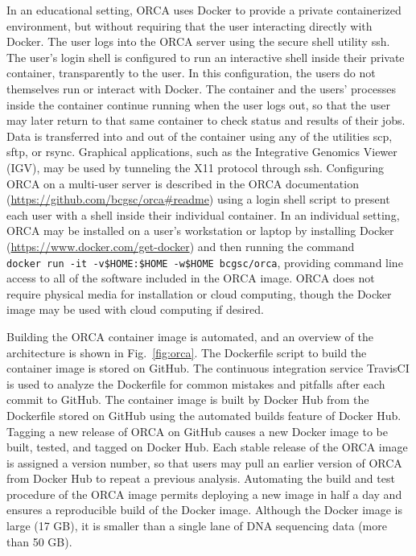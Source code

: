 \documentclass{bioinfo}
\begin{document}
In an educational setting, ORCA uses Docker to provide a private containerized environment, but without requiring that the user interacting directly with Docker. The user logs into the ORCA server using the secure shell utility ssh. The user's login shell is configured to run an interactive shell inside their private container, transparently to the user. In this configuration, the users do not themselves run or interact with Docker. The container and the users' processes inside the container continue running when the user logs out, so that the user may later return to that same container to check status and results of their jobs. Data is transferred into and out of the container using any of the utilities scp, sftp, or rsync. Graphical applications, such as the Integrative Genomics Viewer (IGV), may be used by tunneling the X11 protocol through ssh. Configuring ORCA on a multi-user server is described in the ORCA documentation (\url{https://github.com/bcgsc/orca\#readme}) using a login shell script to present each user with a shell inside their individual container. In an individual setting, ORCA may be installed on a user's workstation or laptop by installing Docker (\url{https://www.docker.com/get-docker}) and then running the command \texttt{docker\ run\ -it\ -v\$HOME:\$HOME\ -w\$HOME\ bcgsc/orca}, providing command line access to all of the software included in the ORCA image. ORCA does not require physical media for installation or cloud computing, though the Docker image may be used with cloud computing if desired.

Building the ORCA container image is automated, and an overview of the architecture is shown in Fig.~\ref{fig:orca}. The Dockerfile script to build the container image is stored on GitHub. The continuous integration service TravisCI is used to analyze the Dockerfile for common mistakes and pitfalls after each commit to GitHub. The container image is built by Docker Hub from the Dockerfile stored on GitHub using the automated builds feature of Docker Hub. Tagging a new release of ORCA on GitHub causes a new Docker image to be built, tested, and tagged on Docker Hub. Each stable release of the ORCA image is assigned a version number, so that users may pull an earlier version of ORCA from Docker Hub to repeat a previous analysis. Automating the build and test procedure of the ORCA image permits deploying a new image in half a day and ensures a reproducible build of the Docker image. Although the Docker image is large (17 GB), it is smaller than a single lane of DNA sequencing data (more than 50 GB).
\end{document}
